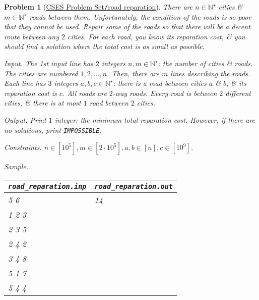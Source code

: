 \documentclass{article}
\newtheorem{problem}{Problem}
\begin{document}
\begin{problem}[\href{https://cses.fi/problemset/task/1675}{CSES Problem Set{\tt/}road reparation}]
    There are $n\in\mathbb{N}^\star$ cities \& $m\in\mathbb{N}^\star$ roads between them. Unfortunately, the condition of the roads is so poor that they cannot be used. Repair some of the roads so that there will be a decent route between any $2$ cities. For each road, you know its reparation cost, \& you should find a solution where the total cost is as small as possible.
    \item {\sf Input.} The 1st input line has $2$ integers $n,m\in\mathbb{N}^\star$: the number of cities \& roads. The cities are numbered $1,2,\ldots,n$. Then, there are $m$ lines describing the roads. Each line has $3$ integers $a,b,c\in\mathbb{N}^\star$: there is a road between cities $a$ \& $b$, \& its reparation cost is $c$. All roads are $2$-way roads. Every road is between $2$ different cities, \& there is at most $1$ road between $2$ cities.
    \item {\sf Output.} Print $1$ integer: the minimum total reparation cost. However, if there are no solutions, print {\tt IMPOSSIBLE}.
    \item {\sf Constraints.} $n\in[10^5],m\in[2\cdot10^5],a,b\in[n],c\in[10^9]$.
    \item {\sf Sample.}
    \begin{table}[H]
        \centering
        \begin{tabular}{|l|l|}
            \hline
            \verb|road_reparation.inp| & \verb|road_reparation.out| \\
            \hline
            5 6 & 14 \\
            1 2 3 & \\
            2 3 5 & \\
            2 4 2 & \\
            3 4 8 & \\
            5 1 7 & \\
            5 4 4 & \\
            \hline
        \end{tabular}
    \end{table}
\end{problem}
\end{document}
